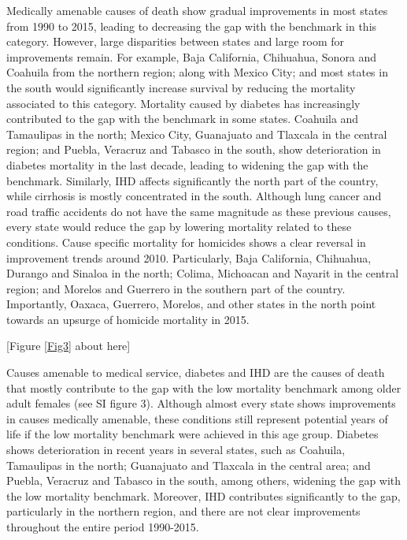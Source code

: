 \documentclass{bmcart}
\begin{document}
Medically amenable causes of death show gradual improvements in most states from 1990 to 2015, leading to decreasing the gap with the benchmark in this category. However, large disparities between states and large room for improvements remain. For example, Baja California, Chihuahua, Sonora and Coahuila from the northern region; along with Mexico City; and most states in the south would significantly increase survival by reducing the mortality associated to this category. Mortality caused by diabetes has increasingly contributed to the gap with the benchmark in some states. Coahuila and Tamaulipas in the north; Mexico City, Guanajuato and Tlaxcala in the central region; and Puebla, Veracruz and Tabasco in the south, show deterioration in diabetes mortality in the last decade, leading to widening the gap with the benchmark. Similarly, IHD affects significantly the north part of the country, while cirrhosis is mostly concentrated in the south. Although lung cancer and road traffic accidents do not have the same magnitude as these previous causes, every state would reduce the gap by lowering mortality related to these conditions. Cause specific mortality for homicides shows a clear reversal in improvement trends around 2010. Particularly, Baja California, Chihuahua, Durango and Sinaloa in the north; Colima, Michoacan and Nayarit in the central region; and Morelos and Guerrero in the southern part of the country. Importantly, Oaxaca, Guerrero, Morelos, and other states in the north point towards an upsurge of homicide mortality in 2015. 

\begin{center}
[Figure \ref{Fig3} about here]
\end{center}

Causes amenable to medical service, diabetes and IHD are the causes of death that mostly contribute to the gap with the low mortality benchmark among older adult females (see SI figure 3). Although almost every state shows improvements in causes medically amenable, these conditions still represent potential years of life if the low mortality benchmark were achieved in this age group. Diabetes shows deterioration in recent years in several states, such as Coahuila, Tamaulipas in the north; Guanajuato and Tlaxcala in the central area; and Puebla, Veracruz and Tabasco in the south, among others, widening the gap with the low mortality benchmark. Moreover, IHD contributes significantly to the gap, particularly in the northern region, and there are not clear improvements throughout the entire period 1990-2015.
\end{document}
